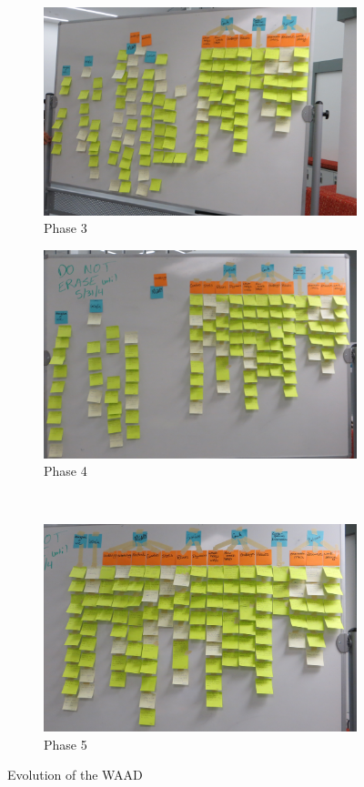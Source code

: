 \documentclass[12pt]{article} %
\begin{document}
\begin{figure}[H]
\begin{subfigure}{.5\linewidth}
      \includegraphics[width=0.95\linewidth]{WAAD_version3}
      \caption{Phase 3}
      \label{fig:WAAD_version3}
    \end{subfigure}%
    \begin{subfigure}{.5\linewidth}
      \centering
      \includegraphics[width=0.95\linewidth]{WAAD_version4}
      \caption{Phase 4}
      \label{fig:WAAD_version4}
    \end{subfigure}\\[1ex]
    \begin{subfigure}{\linewidth}
      \centering
      \includegraphics[width=0.55\linewidth]{WAAD_version5}
      \caption{Phase 5}
      \label{fig:WAAD_version5}
    \end{subfigure}
    \caption{Evolution of the WAAD}
    \label{fig:WAAD}
  \end{figure}
\end{document}
